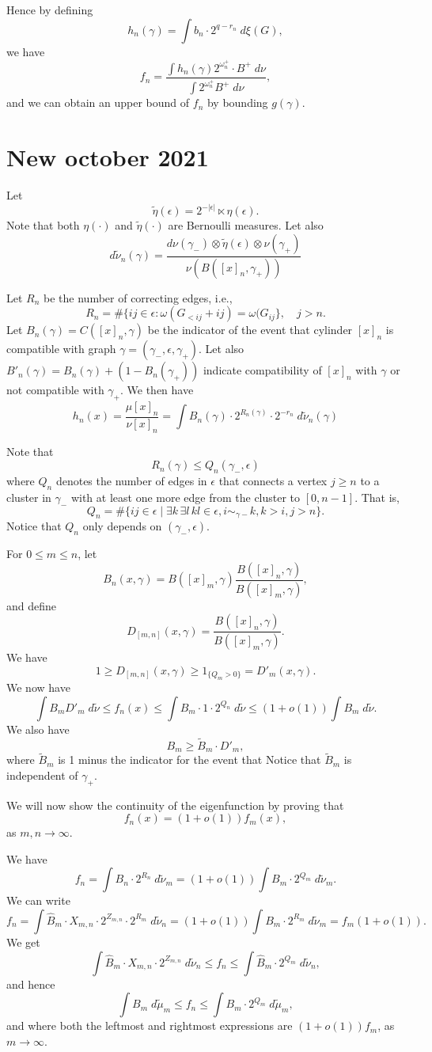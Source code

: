 \documentclass[11pt, a4paper, oneside]{scrartcl}
\theoremstyle{definition}
\theoremstyle{remark}
\providecommand{\ordo}[1]{{o(#1)}}
\providecommand{\e}{\epsilon}
\providecommand{\g}{\gamma}
\begin{document}
Hence by defining 
$$h_n(\gamma)=\int b_n \cdot 2^{q-r_n}\; d\xi(G),$$
we have
$$f_n=\frac{\int h_n(\gamma)2^{\omega_n^+}\cdot B^+\; d\nu}{\int 2^{\omega_n^+} B^+\; d\nu},$$
and we can obtain an upper bound of $f_n$ by bounding $g(\gamma)$.

\section{New october 2021}


Let
$$
\tilde \eta(\epsilon)= 2^{-|\epsilon|} \ltimes \eta (\epsilon).
$$
Note that both $\eta(\cdot)$ and $\tilde\eta (\cdot)$ are Bernoulli measures.
Let also
$$
d\tilde \nu_n(\gamma) =
\frac{d\nu(\gamma_-)\otimes \tilde \eta(\epsilon)\otimes \nu(\gamma_+)}{\nu(B([x]_n,\gamma_+))}
$$

Let $R_n$ be the number of correcting edges, i.e.,
$$
R_n=\# \{ij\in \epsilon: \omega (G_{< ij}+ij)=\omega (G_{ij}\},\quad j>n.
$$
Let $B_n(\g)=C([x]_n,\gamma)$ be the indicator of the event that cylinder $[x]_n$ is compatible with graph $\g=(\g_-,\e,\g_+)$.
Let also $B'_n(\g) = B_n(\g) + (1-B_n(\g_+))$ indicate compatibility of $[x]_n$ with $\g$ or not compatible with $\g_+$.
We then have
\[
  h_n(x) = \frac{\mu [x]_n}{\nu [x]_n}=\int B_n(\g) \cdot 2^{R_n(\g)} \cdot 2^{-r_n}\; d\tilde \nu_n (\gamma)
\]

Note that
$$ R_n(\g) \le Q_n(\g_-,\e) $$
where $Q_n$ denotes the number of edges in $\e$ that connects a vertex $j\ge n$ to a
cluster in $\g_-$ with at least one more edge from the cluster to $[0,n-1]$. That is,
$$  Q_n=\# \{ij \in \epsilon \mid  \exists k\, \exists l\, kl\in\e,  i \sim_{\gamma-} k, k>i, j > n\}.$$
Notice that $Q_n$ only depends on $(\gamma_-,\epsilon)$.

For $0\leq m\leq n$, let
$$B_n(x,\gamma)=B([x]_m,\gamma)\frac{B([x]_n,\gamma)}{B([x]_m, \gamma)},$$
and define
$$D_{[m,n]}(x,\gamma)=\frac{B([x]_n,\gamma)}{B([x]_m, \gamma)}.$$ We have
$$1\geq D_{[m,n]}(x,\gamma)\geq 1_{\{Q_m>0\}}=D'_m(x,\gamma).$$
We now have
$$ \int B_m D'_m \; d\tilde \nu \leq f_n(x)\leq \int B_m \cdot 1 \cdot 2^{Q_n} \; d\tilde \nu \leq (1+\ordo{1})\int B_m \; d\tilde \nu .$$
We also have
$$B_m\geq \tilde B_m \cdot D'_m,$$
where $\tilde B_m$ is 1 minus the indicator for the event that
Notice that $\tilde B_m$ is independent of $\gamma_+$.

We will now show the continuity of the eigenfunction by proving that
$$f_n(x)=(1+\ordo{1})f_m(x),$$
as $m,n \to \infty$.

We have
$$f_n=\int B_n \cdot 2^{R_n} \; d\tilde \nu_m=(1+\ordo{1})\int B_m \cdot 2^{Q_m} \; d\tilde \nu_m.$$
We can write
$$f_n=\int \hat B_m \cdot X_{m,n} \cdot 2^{Z_{m,n}}\cdot 2^{R_m}\; d\tilde \nu_n=(1+\ordo{1})\int B_m \cdot 2^{R_m}\; d\tilde \nu_m=f_m(1+\ordo{1}).$$
We get
$$\int \hat B_m \cdot X_{m,n} \cdot 2^{Z_{m,n}} \; d\tilde \nu_n \leq f_n\leq \int \hat B_m \cdot 2^{Q_m} \; d\tilde \nu_n,$$
and hence
$$\int B_m \; d\tilde \mu_m \leq f_n \leq \int  B_m \cdot 2^{Q_m} \; d\tilde \mu_m,$$
and where both the leftmost and rightmost expressions are $(1+\ordo{1})f_m$, as $m\to \infty$.
\end{document}
